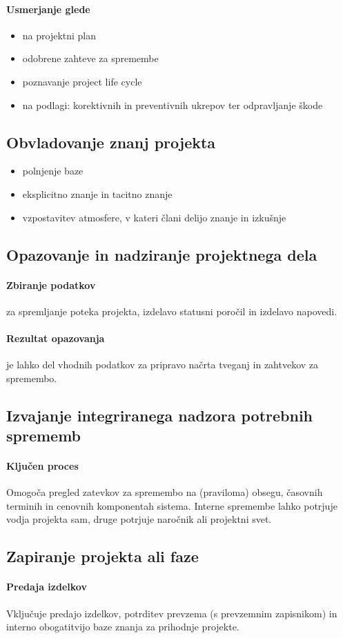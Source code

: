 \documentclass[a4paper,12pt]{report}
\begin{document}
         \paragraph{Usmerjanje glede}
            \begin{itemize}
               \item na projektni plan
               \item odobrene zahteve za spremembe
               \item poznavanje project life cycle
               \item na podlagi: korektivnih in preventivnih ukrepov ter odpravljanje škode
            \end{itemize}
      \subsection{Obvladovanje znanj projekta}
         \begin{itemize}
            \item polnjenje baze
            \item eksplicitno znanje in tacitno znanje
            \item vzpostavitev atmosfere, v kateri člani delijo znanje in izkušnje
         \end{itemize}

      \subsection{Opazovanje in nadziranje projektnega dela}
         \paragraph{Zbiranje podatkov} za spremljanje poteka projekta, izdelavo statusni poročil in izdelavo napovedi.
         \paragraph{Rezultat opazovanja} je lahko del vhodnih podatkov za pripravo načrta tveganj in zahtvekov za spremembo.

      \subsection{Izvajanje integriranega nadzora potrebnih sprememb}
         \paragraph{Ključen proces} Omogoča pregled zatevkov za spremembo na (praviloma) obsegu, časovnih terminih in cenovnih komponentah sistema. Interne spremembe lahko potrjuje vodja projekta sam, druge potrjuje naročnik ali projektni svet.
      \subsection{Zapiranje projekta ali faze}
         \paragraph{Predaja izdelkov} Vključuje predajo izdelkov, potrditev prevzema (s prevzemnim zapisnikom) in interno obogatitvijo baze znanja za prihodnje projekte.
   
\end{document}
